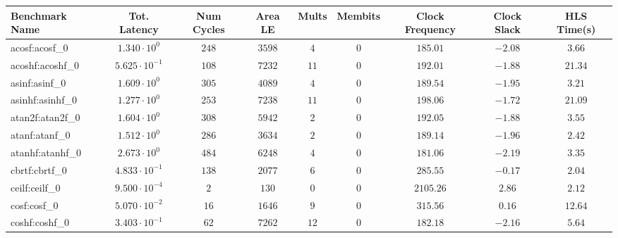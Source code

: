 \begin{tabular}{|l|c|c|c|c|c|c|c|c|}
\hline
Benchmark Name               & Tot. Latency            & Num Cycles & Area LE    & Mults   & Membits & Clock Frequency & Clock Slack & HLS Time(s) \\
\hline
acosf:acosf\_0               & $ 1.340 \cdot 10^{0}  $ & $ 248    $ & $ 3598   $ & $ 4   $ & $ 0   $ & $ 185.01      $ & $ -2.08   $ & $ 3.66    $ \\
acoshf:acoshf\_0             & $ 5.625 \cdot 10^{-1} $ & $ 108    $ & $ 7232   $ & $ 11  $ & $ 0   $ & $ 192.01      $ & $ -1.88   $ & $ 21.34   $ \\
asinf:asinf\_0               & $ 1.609 \cdot 10^{0}  $ & $ 305    $ & $ 4089   $ & $ 4   $ & $ 0   $ & $ 189.54      $ & $ -1.95   $ & $ 3.21    $ \\
asinhf:asinhf\_0             & $ 1.277 \cdot 10^{0}  $ & $ 253    $ & $ 7238   $ & $ 11  $ & $ 0   $ & $ 198.06      $ & $ -1.72   $ & $ 21.09   $ \\
atan2f:atan2f\_0             & $ 1.604 \cdot 10^{0}  $ & $ 308    $ & $ 5942   $ & $ 2   $ & $ 0   $ & $ 192.05      $ & $ -1.88   $ & $ 3.55    $ \\
atanf:atanf\_0               & $ 1.512 \cdot 10^{0}  $ & $ 286    $ & $ 3634   $ & $ 2   $ & $ 0   $ & $ 189.14      $ & $ -1.96   $ & $ 2.42    $ \\
atanhf:atanhf\_0             & $ 2.673 \cdot 10^{0}  $ & $ 484    $ & $ 6248   $ & $ 4   $ & $ 0   $ & $ 181.06      $ & $ -2.19   $ & $ 3.35    $ \\
cbrtf:cbrtf\_0               & $ 4.833 \cdot 10^{-1} $ & $ 138    $ & $ 2077   $ & $ 6   $ & $ 0   $ & $ 285.55      $ & $ -0.17   $ & $ 2.04    $ \\
ceilf:ceilf\_0               & $ 9.500 \cdot 10^{-4} $ & $ 2      $ & $ 130    $ & $ 0   $ & $ 0   $ & $ 2105.26     $ & $ 2.86    $ & $ 2.12    $ \\
cosf:cosf\_0                 & $ 5.070 \cdot 10^{-2} $ & $ 16     $ & $ 1646   $ & $ 9   $ & $ 0   $ & $ 315.56      $ & $ 0.16    $ & $ 12.64   $ \\
coshf:coshf\_0               & $ 3.403 \cdot 10^{-1} $ & $ 62     $ & $ 7262   $ & $ 12  $ & $ 0   $ & $ 182.18      $ & $ -2.16   $ & $ 5.64    $ \\

\end{tabular}
